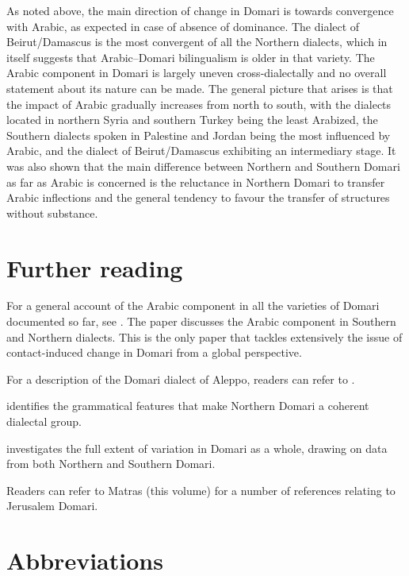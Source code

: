 \documentclass[output=paper]{langsci/langscibook}
\begin{document}
As noted above, the main direction of change in Domari is towards convergence with Arabic, as expected in case of absence of dominance. The dialect of Beirut/Damascus is the most convergent of all the Northern dialects, which in itself suggests that Arabic--Domari bilingualism is older in that variety. The Arabic component in Domari is largely uneven cross-dialectally and no overall statement about its nature can be made. The general picture that arises is that the impact of Arabic gradually increases from north to south, with the dialects located in northern Syria and southern Turkey being the least Arabized, the Southern dialects spoken in Palestine and Jordan being the most influenced by Arabic, and the dialect of Beirut/Damascus exhibiting an intermediary stage. It was also shown that the main difference between Northern and Southern Domari as far as Arabic is concerned is the reluctance in Northern Domari to transfer Arabic inflections and the general tendency to favour the transfer of structures without substance.

\section*{Further reading}

For a general account of the Arabic component in all the varieties of Domari documented so far, see \citet{Herin2018}. The paper discusses the Arabic component in Southern and Northern dialects. This is the only paper that tackles extensively the issue of contact-induced change in Domari from a global perspective.

For a description of the Domari dialect of Aleppo, readers can refer to \citet{Herin2012}.

\citet{Herin2014Domari} identifies the grammatical features that make Northern Domari a coherent dialectal group.

\citet{Herin2016} investigates the full extent of variation in Domari as a whole, drawing on data from both Northern and Southern Domari.

Readers can refer to Matras (this volume) for a number of references relating to Jerusalem Domari.

\section*{Abbreviations}
\end{document}
